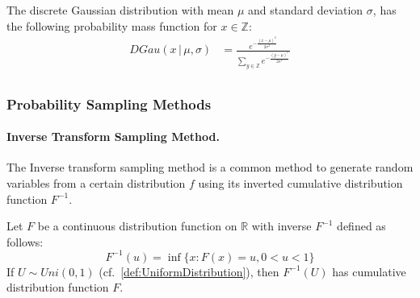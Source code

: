 \begin{definition}
    \label{def:DiscreteGaussianDistribution}
    The discrete Gaussian distribution with mean $\mu$ and standard deviation $\sigma$, has the following probability mass function for $x\in \mathbb{Z}$:
    \begin{equation}
        \begin{split}
            DGau \left(x \,|\,\mu,\sigma\right)&=\frac{e^{-\frac{\left(x-\mu\right)^2}{2 \sigma^2}} }{\sum_{y\in \mathbb{Z}} e^{-\frac{\left(y-\mu\right)^2}{2 \sigma^2}}}\\
        \end{split}
    \end{equation}
\end{definition}


\subsubsection{Probability Sampling Methods}
\label{subsec:ProbabilitySamplingMethods}

\paragraph{Inverse Transform Sampling Method.}
The Inverse transform sampling method is a common method to generate random variables from a certain distribution $f$ using its inverted cumulative distribution function $F^{-1}$.
\begin{theorem}
    \label{theorem:inversionSamplingMethod}
    Let $F$ be a continuous distribution function on $\mathbb{R}$ with inverse $F^{-1}$ defined as follows:
    \begin{equation}
        F^{-1}\left( u\right) =\inf \{ x:F\left( x\right) =u,0 <u < 1\}
    \end{equation}
    If $U\sim Uni\left( 0,1\right)$ (cf.~\autoref{def:UniformDistribution}), then $F^{-1}\left( U\right)$ has cumulative distribution function $F$.
\end{theorem}


